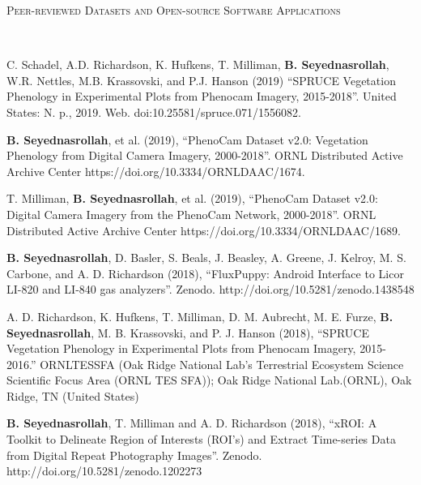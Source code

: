 \documentclass[10pt]{article}
\newenvironment{changemargin}[2]{%
  \begin{list}{}{%
 \setlength{\topsep}{0pt}%
 \setlength{\leftmargin}{#1}%
 \setlength{\rightmargin}{#2}%
 \setlength{\listparindent}{\parindent}%
 \setlength{\itemindent}{\parindent}%
 \setlength{\parsep}{\parskip}%
  }%
  \item[]}{\end{list}
}
\newcommand{\lineover}{
  \begin{changemargin}{-0.05in}{-0.05in}
  \vspace*{-8pt}
  \hrulefill \\
  \vspace*{-2pt}
  \end{changemargin}
}
\newcommand{\header}[1]{
  \begin{changemargin}{-0.5in}{-0.5in}
  \scshape{#1}\\
  \lineover
  \end{changemargin}
}
\newenvironment{body} {
  \vspace*{-2pt}
  \begin{changemargin}{-0.5in}{-0.5in}
}
{\end{changemargin}
}
\begin{document}
\medskip



\header{Peer-reviewed Datasets and Open-source Software Applications}

\begin{body}
  \begin{etaremune}
  
\item  C. Schadel, A.D. Richardson, K. Hufkens, T. Milliman, \textbf{B. Seyednasrollah},  W.R. Nettles, M.B. Krassovski, and P.J. Hanson (2019) ``SPRUCE Vegetation Phenology in Experimental Plots from Phenocam Imagery, 2015-2018''. United States: N. p., 2019. Web. doi:10.25581/spruce.071/1556082.\\
    \medskip


    \item  \textbf{B. Seyednasrollah}, et al. (2019), ``PhenoCam Dataset v2.0: Vegetation Phenology from Digital Camera Imagery, 2000-2018''.  ORNL Distributed Active Archive Center https://doi.org/10.3334/ORNLDAAC/1674. \\
    \medskip

    \item T. Milliman, \textbf{B. Seyednasrollah}, et al. (2019), ``PhenoCam Dataset v2.0: Digital Camera Imagery from the PhenoCam Network, 2000-2018''. ORNL Distributed Active Archive Center https://doi.org/10.3334/ORNLDAAC/1689. \\
    \medskip

    \item \textbf{B. Seyednasrollah}, D. Basler, S. Beals, J. Beasley, A. Greene, J. Kelroy, M. S. Carbone, and A. D. Richardson (2018), ``FluxPuppy: Android Interface to Licor LI-820 and LI-840 gas analyzers''. Zenodo. http://doi.org/10.5281/zenodo.1438548\\
    \medskip

    \item A. D. Richardson, K. Hufkens, T. Milliman, D. M. Aubrecht, M. E. Furze, \textbf{B. Seyednasrollah}, M. B. Krassovski, and P. J. Hanson (2018), ``SPRUCE Vegetation Phenology in Experimental Plots from Phenocam Imagery, 2015-2016.'' ORNLTESSFA (Oak Ridge National Lab's Terrestrial Ecosystem Science Scientific Focus Area (ORNL TES SFA)); Oak Ridge National Lab.(ORNL), Oak Ridge, TN (United States)\\
    \medskip

    \item \textbf{B. Seyednasrollah}, T. Milliman and A. D. Richardson (2018),  ``xROI: A Toolkit to Delineate Region of Interests (ROI's) and Extract Time-series Data from Digital Repeat Photography Images''. Zenodo. http://doi.org/10.5281/zenodo.1202273\\
    \medskip


\end{etaremune}
\end{body}
\end{document}
